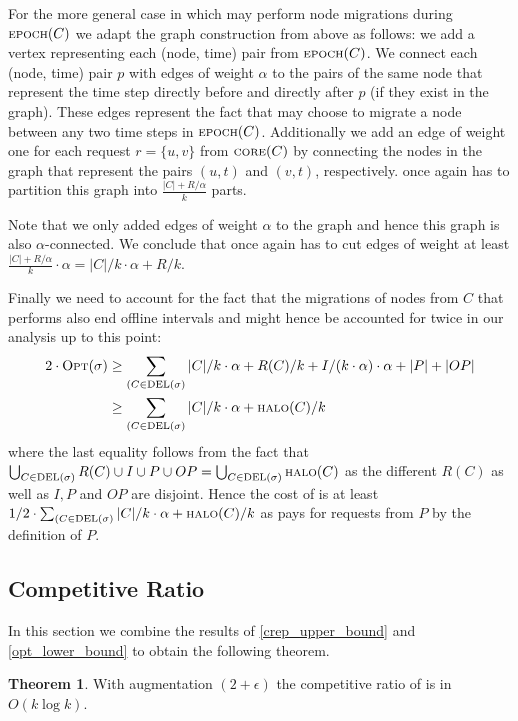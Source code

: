 \documentclass[a4paper,xcolor=dvipsnames, tikz, 12pt]{article}
\newcommand{\crep}{\text{C{\scriptsize REP}}}
\newcommand{\del}{\text{\scriptsize DEL}}
\newcommand{\opt}{\text{O{\scriptsize PT}}}
\newcommand{\core}{\text{\scriptsize CORE}}
\newcommand{\halo}{\text{\scriptsize HALO}}
\newcommand{\epoch}{\text{\scriptsize EPOCH}}
\theoremstyle{definition}
\newtheorem{theo}[defi]{Theorem}
\begin{document}
For the more general case in which \opt{} may perform node migrations during $\epoch(C)$ we adapt the graph construction from above as follows: we add a vertex representing each (node, time) pair from $\epoch(C)$.
We connect each (node, time) pair $p$ with edges of weight $\alpha$ to the pairs of the same node that represent the time step directly before and directly after $p$ (if they exist in the graph). These edges represent the fact that \opt{} may choose to migrate a node between any two time steps in $\epoch(C)$.
Additionally we add an edge of weight one for each request $r=\{u,v\}$ from $\core(C)$ by connecting the nodes in the graph that represent the pairs $(u,t)$ and $(v,t)$, respectively. \opt{} once again has to partition this graph into $\frac{|C|+R/\alpha}{k}$ parts.

Note that we only added edges of weight $\alpha$ to the graph and hence this graph is also $\alpha$-connected. We conclude that once again \opt{} has to cut edges of weight at least $\frac{|C|+R/\alpha}{k}\cdot\alpha=|C|/k\cdot\alpha+R/k$.

Finally we need to account for the fact that the migrations of nodes from $C$ that \opt{} performs also end offline intervals and might hence be accounted for twice in our analysis up to this point:
\begin{align*}
2\cdot\opt(\sigma)&\geq\sum_{(C\in\del{}(\sigma)}|C|/k\cdot\alpha+R(C)/k+I/(k\cdot\alpha)\cdot\alpha+|P|+|OP|\\
&\geq\sum_{(C\in\del{}(\sigma)}|C|/k\cdot\alpha+\halo(C)/k
\end{align*}
where the last equality follows from the fact that 
$\bigcup_{C\in\del(\sigma)}R(C)\cup I\cup P\cup OP=\bigcup_{C\in\del(\sigma)}\halo(C)$ as the different $R(C)$ as well as $I, P$ and $OP$ are disjoint.
Hence the cost of \opt{} is at least $1/2\cdot\sum_{(C\in\del{}(\sigma)}|C|/k\cdot\alpha+\halo(C)/k$ as \opt{} pays for requests from $P$ by the definition of $P$.


\subsection{Competitive Ratio}
In this section we combine the results of \cref{crep_upper_bound} and \cref{opt_lower_bound} to obtain the following theorem.

\begin{theo}
	\label{comp_ratio_theo}
	With augmentation $(2+\epsilon)$ the competitive ratio of \crep{} is in $O(k \log k)$.
\end{theo}
\end{document}
